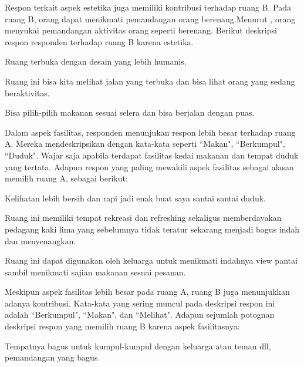 \documentclass[11pt]{udthesis} %
\begin{document}
Respon terkait aspek estetika juga memiliki kontribusi terhadap ruang B. Pada ruang B, orang dapat menikmati pemandangan orang berenang.Menurut \cite{mumcu2016}, orang menyukai pemandangan aktivitas orang seperti berenang. Berikut deskripsi respon responden terhadap ruang B karena estetika.

\begin{quoting}
    Ruang terbuka dengan desain yang lebih humanis.
\end{quoting}

\begin{quoting}
    Ruang ini bisa kita melihat jalan yang terbuka dan bisa lihat orang yang sedang beraktivitas.
\end{quoting}

\begin{quoting}
    Bisa pilih-pilih makanan sesuai selera dan bisa berjalan dengan puas.
\end{quoting}

Dalam aspek fasilitas, responden menunjukan respon lebih besar terhadap ruang A. Mereka mendeskripsikan dengan kata-kata seperti ``Makan", ``Berkumpul", ``Duduk". Wajar saja apabila terdapat fasilitas kedai makanan dan tempat duduk yang tertata. Adapun respon yang paling mewakili aspek fasilitas sebagai alasan memilih ruang A, sebagai berikut:

\begin{quoting}
    Kelihatan lebih bersih dan rapi jadi enak buat saya santai santai duduk.
\end{quoting}

\begin{quoting}
    Ruang ini memiliki tempat rekreasi dan refreshing sekaligus memberdayakan pedagang kaki lima yang sebelumnya tidak teratur sekarang menjadi bagus indah dan menyenangkan.
\end{quoting}

\begin{quoting}
    Ruang ini dapat digunakan oleh keluarga untuk menikmati indahnya view pantai sambil menikmati sajian makanan sesuai pesanan.
\end{quoting}

Meskipun aspek fasilitas lebih besar pada ruang A, ruang B juga menunjukkan adanya kontribusi. Kata-kata yang sering muncul pada deskripsi respon ini adalah ``Berkumpul", ``Makan", dan ``Melihat". Adapun sejumlah potognan deskripsi respon yang memilih ruang B karena aspek fasilitasnya:

\begin{quoting}
    Tempatnya bagus untuk kumpul-kumpul dengan keluarga atau teman dll, pemandangan yang bagus.
\end{quoting}
\end{document}
